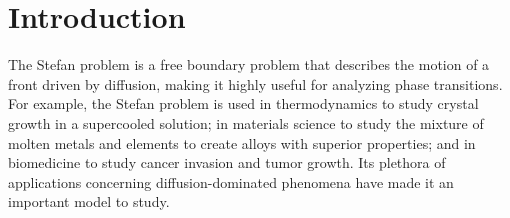 \documentclass[oneside,12pt,final]{/Applications/TeX/packages/ucthesis-CA2012}
\begin{document}
\begin{frontmatter}
	
	\maketitle
	\approvalpage
	\copyrightpage
	
	
	\tableofcontents
	\listoffigures
	\listoftables
\end{frontmatter}

\begin{mainmatter}

\pagestyle{fancy}
\renewcommand{\chaptermark}[1]{\markboth{{\sf #1 \hspace*{\fill} Chapter~\thechapter}}{} }
\renewcommand{\sectionmark}[1]{\markright{ {\sf Section~\thesection \hspace*{\fill} #1 }}}
\fancyhf{}

\makeatletter \if@twoside \fancyhead[LO]{\small \rightmark} \fancyhead[RE]{\small\leftmark} \else \fancyhead[LO]{\small\leftmark}
\fancyhead[RE]{\small\rightmark} \fi

\def\cleardoublepage{\clearpage\if@openright \ifodd\c@page\else
  \hbox{}
  \vspace*{\fill}
  \begin{center}
    This page intentionally left blank
  \end{center}
  \vspace{\fill}
  \thispagestyle{plain}
  \newpage
  \fi \fi}
\makeatother
\fancyfoot[c]{\textrm{\textup{\thepage}}} %
\fancyfoot[C]{\thepage}
\renewcommand{\headrulewidth}{0.4pt}

 { \fancyhf{} \fancyfoot[C]{\thepage}
\renewcommand{\headrulewidth}{0pt}
\renewcommand{\footrulewidth}{0pt}}

\chapter{Introduction}

The Stefan problem is a free boundary problem that describes the motion of a front driven by diffusion, making it highly useful for analyzing phase transitions. For example, the Stefan problem is used in thermodynamics to study crystal growth in a supercooled solution; in materials science to study the mixture of molten metals and elements to create alloys with superior properties; and in biomedicine to study cancer invasion and tumor growth. Its plethora of applications concerning diffusion-dominated phenomena have made it an important model to study.


\end{mainmatter}
\end{document}
